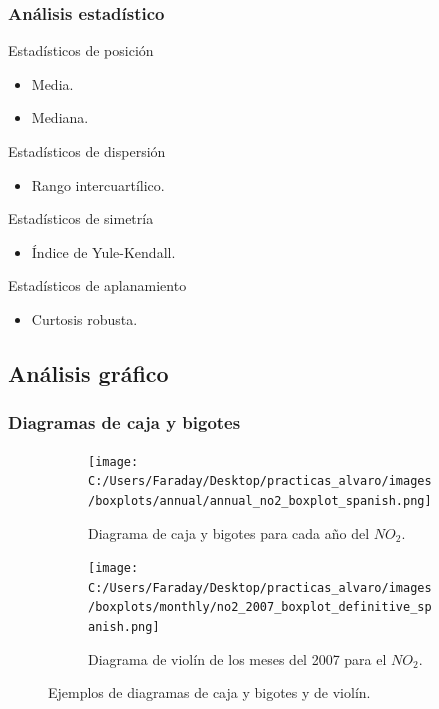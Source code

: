 \documentclass[12pt]{beamer}
\begin{document}
\begin{frame}
\frametitle{Análisis estadístico}
\begin{block}{Estadísticos de posición}
\begin{itemize}
\item Media.
\item Mediana.
\end{itemize}
\end{block}
\pause
\begin{block}{Estadísticos de dispersión}
\begin{itemize}
\item<1-> Rango intercuartílico.
\end{itemize}
\end{block}
\pause
\begin{block}{Estadísticos de simetría}
\begin{itemize}
\item<1-> Índice de Yule-Kendall.
\end{itemize}
\end{block}
\pause
\begin{block}{Estadísticos de aplanamiento}
\begin{itemize}
\item<1-> Curtosis robusta.
\end{itemize}
\end{block}
\end{frame}

\subsection{Análisis gráfico}
\begin{frame}
\frametitle{Diagramas de caja y bigotes}
\tiny
\begin{figure}[H]
\centering
\begin{subfigure}[H]{0.45\textwidth}
\texttt{[image: C:/Users/Faraday/Desktop/practicas\_alvaro/images/boxplots/annual/annual\_no2\_boxplot\_spanish.png]}
\caption{Diagrama de caja y bigotes para cada año del $NO_{2}$.}
\label{fig:box-ejem-1}
\end{subfigure}
%
\begin{subfigure}[H]{0.45\textwidth}
\texttt{[image: C:/Users/Faraday/Desktop/practicas\_alvaro/images/boxplots/monthly/no2\_2007\_boxplot\_definitive\_spanish.png]}
\caption{Diagrama de violín de los meses del 2007 para el $NO_{2}$.}
\label{fig:box-ejem-2}
\end{subfigure}
\caption{Ejemplos de diagramas de caja y bigotes y de violín.}
\end{figure}
\end{frame}
\end{document}
